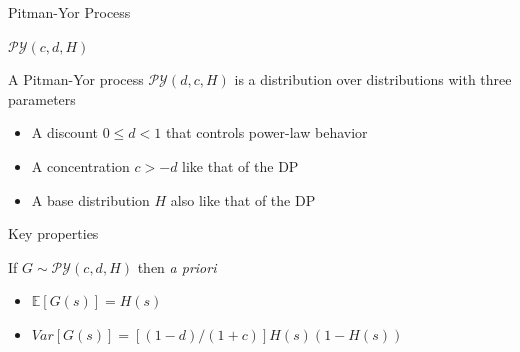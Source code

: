 \documentclass{beamer}
\newcommand{\G}{\mathcal{G}}
\newcommand{\PY}{\mathcal{P}\mathcal{Y}}
\begin{document}
\begin{frame}[t]{Pitman-Yor Process \cite{Pitman1997}}

\begin{block}{$\PY(c,d,H)$}

 A Pitman-Yor process $\PY(d,c,H)$ is a distribution over distributions with three parameters

\begin{itemize}
	\item A discount $ 0 \le d < 1 $ that controls power-law behavior
	\item A concentration $c > -d$ like that of the DP
	\item A base distribution $H$ also like that of the DP
\end{itemize}

\end{block}

\begin{block}{Key properties}

If $G\sim\PY(c,d,H)$ then {\em a priori}
	\begin{itemize}
		\item $\mathbb{E}[G(s)] = H(s)$
		\item $Var[G(s)] = [(1-d) / (1 + c)] H(s)(1-H(s))$
	\end{itemize}
\end{block}
\end{frame}

%
%	
	
\end{document}
